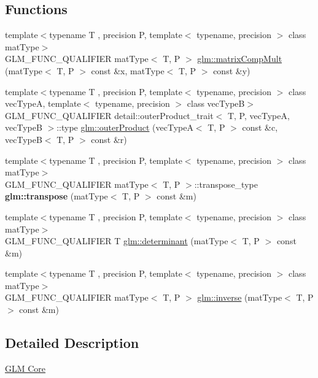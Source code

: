 \subsection*{Functions}
\begin{DoxyCompactItemize}
\item 
{\footnotesize template$<$typename T , precision P, template$<$ typename, precision $>$ class mat\+Type$>$ }\\G\+L\+M\+\_\+\+F\+U\+N\+C\+\_\+\+Q\+U\+A\+L\+I\+F\+I\+ER mat\+Type$<$ T, P $>$ \hyperlink{group__core__func__matrix_ga4a54992e4741188ee624b21e3ba91814}{glm\+::matrix\+Comp\+Mult} (mat\+Type$<$ T, P $>$ const \&x, mat\+Type$<$ T, P $>$ const \&y)
\item 
{\footnotesize template$<$typename T , precision P, template$<$ typename, precision $>$ class vec\+TypeA, template$<$ typename, precision $>$ class vec\+TypeB$>$ }\\G\+L\+M\+\_\+\+F\+U\+N\+C\+\_\+\+Q\+U\+A\+L\+I\+F\+I\+ER detail\+::outer\+Product\+\_\+trait$<$ T, P, vec\+TypeA, vec\+TypeB $>$\+::type \hyperlink{group__core__func__matrix_gae9f513dc8e4f3ceb993669321b6d0f09}{glm\+::outer\+Product} (vec\+TypeA$<$ T, P $>$ const \&c, vec\+TypeB$<$ T, P $>$ const \&r)
\item 
\mbox{\label{func__matrix_8inl_a44eaf0309b3d7a9e71e31b5d4a8dbaab}} 
{\footnotesize template$<$typename T , precision P, template$<$ typename, precision $>$ class mat\+Type$>$ }\\G\+L\+M\+\_\+\+F\+U\+N\+C\+\_\+\+Q\+U\+A\+L\+I\+F\+I\+ER mat\+Type$<$ T, P $>$\+::transpose\+\_\+type {\bfseries glm\+::transpose} (mat\+Type$<$ T, P $>$ const \&m)
\item 
{\footnotesize template$<$typename T , precision P, template$<$ typename, precision $>$ class mat\+Type$>$ }\\G\+L\+M\+\_\+\+F\+U\+N\+C\+\_\+\+Q\+U\+A\+L\+I\+F\+I\+ER T \hyperlink{group__core__func__matrix_ga26ea77c574802bc6fc193c40478718d2}{glm\+::determinant} (mat\+Type$<$ T, P $>$ const \&m)
\item 
{\footnotesize template$<$typename T , precision P, template$<$ typename, precision $>$ class mat\+Type$>$ }\\G\+L\+M\+\_\+\+F\+U\+N\+C\+\_\+\+Q\+U\+A\+L\+I\+F\+I\+ER mat\+Type$<$ T, P $>$ \hyperlink{group__core__func__matrix_gaff4e89603cf51cdbcedebc57cd8808a3}{glm\+::inverse} (mat\+Type$<$ T, P $>$ const \&m)
\end{DoxyCompactItemize}


\subsection{Detailed Description}
\hyperlink{group__core}{G\+LM Core} 